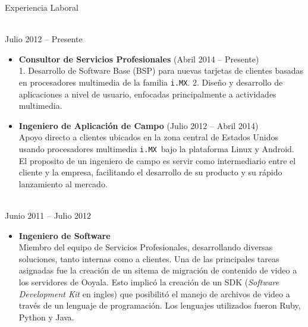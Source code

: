 \documentclass{resume}
\def\imx{\texttt{i.MX}}
\begin{document}
\begin{category}{Experiencia Laboral}


\\
Julio 2012 -- Presente
\begin{itemize}
\item \textbf{Consultor de Servicios Profesionales} (Abril 2014 -- Presente)\\
1. Desarrollo de Software Base (BSP) para nuevas tarjetas de clientes basadas en procesadores multimedia de la familia \imx. 2. Dise\~no y desarrollo de aplicaciones a nivel de usuario, enfocadas principalmente a actividades multimedia.
\end{itemize}

\begin{itemize}
\item \textbf{Ingeniero de Aplicaci\'on de Campo} (Julio 2012 -- Abril 2014)\\
Apoyo directo a clientes ubicados en la zona central de Estados Unidos usando procesadores multimedia \imx\ bajo la plataforma Linux y Android. El proposito de un ingeniero de campo es servir como intermediario entre el cliente y la empresa, facilitando el desarrollo de su
producto y su r\'apido lanzamiento al mercado.
\end{itemize}

\\
Junio 2011 -- Julio 2012
\begin{itemize}
\item \textbf{Ingeniero de Software}\\
Miembro del equipo de Servicios Profesionales, desarrollando diversas soluciones, tanto internas como a clientes.
Una de las principales tareas asignadas fue la creaci\'on de un sitema de migraci\'on de contenido de video a los
servidores de Ooyala. Esto implic\'o la creaci\'on de un SDK (\textit{Software Development Kit} en ingles) que posibilit\'o
el manejo de archivos de video a trav\'es de un lenguaje de programaci\'on. Los lenguajes utilizados fueron Ruby, Python y Java.
\end{itemize}


\end{category}
\end{document}
